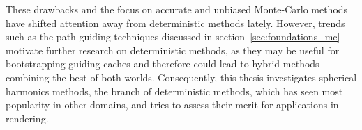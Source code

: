 These drawbacks and the focus on accurate and unbiased Monte-Carlo methods have shifted attention away from deterministic methods lately. However, trends such as the path-guiding techniques discussed in section~\ref{sec:foundations_mc} motivate further research on deterministic methods, as they may be useful for bootstrapping guiding caches and therefore could lead to hybrid methods combining the best of both worlds. Consequently, this thesis investigates spherical harmonics methods, the branch of deterministic methods, which has seen most popularity in other domains, and tries to assess their merit for applications in rendering.

